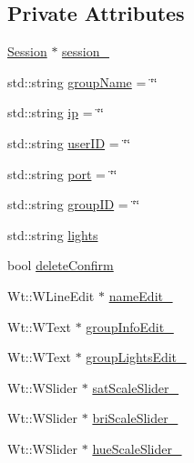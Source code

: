 \subsection*{Private Attributes}
\begin{DoxyCompactItemize}
\item 
\hyperlink{classSession}{Session} $\ast$ \hyperlink{classSingleGroupsControlWidget_af179b3aceb389ea2b7eb196c0cf2575d}{session\+\_\+}
\item 
std\+::string \hyperlink{classSingleGroupsControlWidget_a39660eeffbb0d7a8f48409c561c2664c}{group\+Name} = \char`\"{}\char`\"{}
\item 
std\+::string \hyperlink{classSingleGroupsControlWidget_a541ddd57077700f7a99ffca17636a771}{ip} = \char`\"{}\char`\"{}
\item 
std\+::string \hyperlink{classSingleGroupsControlWidget_a8e485f9b17c2934de11f8991a7b38bf6}{user\+ID} = \char`\"{}\char`\"{}
\item 
std\+::string \hyperlink{classSingleGroupsControlWidget_a6ce38d1d258028fcbefa83436ef49b5f}{port} = \char`\"{}\char`\"{}
\item 
std\+::string \hyperlink{classSingleGroupsControlWidget_ace03ddb209483e37c7f760fdb73baba7}{group\+ID} = \char`\"{}\char`\"{}
\item 
std\+::string \hyperlink{classSingleGroupsControlWidget_a0d6cf0bbd169e65cd4de29aea4a2e1b9}{lights}
\item 
bool \hyperlink{classSingleGroupsControlWidget_ab428d0f6a6c39724b434fc80e39c6b18}{delete\+Confirm}
\item 
Wt\+::\+W\+Line\+Edit $\ast$ \hyperlink{classSingleGroupsControlWidget_ab0dfc6fa2c8b3d5d2feb1858a1c3a2ef}{name\+Edit\+\_\+}
\item 
Wt\+::\+W\+Text $\ast$ \hyperlink{classSingleGroupsControlWidget_a2b80c0e1b05f5c1086d89512342d206f}{group\+Info\+Edit\+\_\+}
\item 
Wt\+::\+W\+Text $\ast$ \hyperlink{classSingleGroupsControlWidget_a0c5cd5692fc7b4be63b7732988021888}{group\+Lights\+Edit\+\_\+}
\item 
Wt\+::\+W\+Slider $\ast$ \hyperlink{classSingleGroupsControlWidget_ad41ed79fdff6691c6266f1a582b9962e}{sat\+Scale\+Slider\+\_\+}
\item 
Wt\+::\+W\+Slider $\ast$ \hyperlink{classSingleGroupsControlWidget_a761ff567fbcdc336c2b13ca9b9202478}{bri\+Scale\+Slider\+\_\+}
\item 
Wt\+::\+W\+Slider $\ast$ \hyperlink{classSingleGroupsControlWidget_adeb7eef1ab64cc98651ece9186e4dd68}{hue\+Scale\+Slider\+\_\+}

\end{DoxyCompactItemize}
